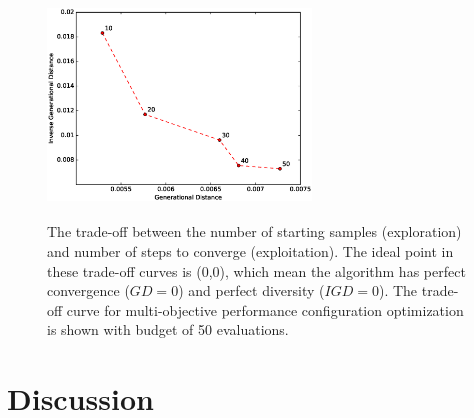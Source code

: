 \begin{figure}
\centering
\includegraphics[height=6cm,width=7cm]{Figures/tuning_1.eps}
\caption{The trade-off between the number of starting samples (exploration) and number of steps to converge (exploitation). The ideal point in these trade-off curves is (0,0), which mean the algorithm has perfect convergence ($GD=0$) and perfect diversity ($IGD=0$). The trade-off curve for multi-objective performance configuration optimization is shown with budget of 50 evaluations.}\label{fig:param_tuning_multiconfig}
\end{figure} 

\section{Discussion}
